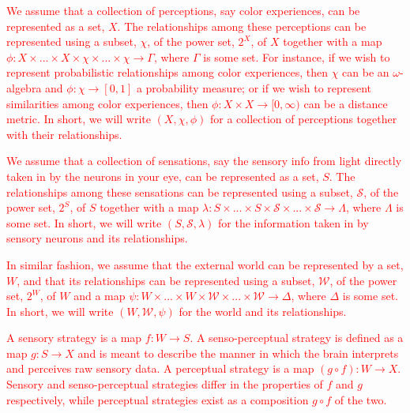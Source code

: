 \documentclass{article}[10pt]
\begin{document}
\textcolor{red}{We assume that a collection of perceptions, say color experiences, can be represented as a set, $X$. 
The relationships among these perceptions can be represented using a subset, $\chi$, of the power set, $2^X$, of $X$ together with a map $\phi: X \times ... \times X \times \chi \times ... \times \chi \rightarrow \Gamma$, where $\Gamma$ is some set. 
For instance, if we wish to represent probabilistic relationships among color experiences, then $\chi$ can be an $\omega$-algebra and $\phi:\chi \rightarrow [0,1]$ a probability measure; or if we wish to represent similarities among color experiences, then $\phi:X \times X \rightarrow [0,\infty)$ can be a distance metric. 
In short, we will write $(X,\chi,\phi)$ for a collection of perceptions together with their relationships.} \par
\textcolor{red}{We assume that a collection of sensations, say the sensory info from light directly taken in by the neurons in your eye, can be represented as a set, $S$.  
The relationships among these sensations can be represented using a subset, $\mathcal{S}$, of the power set, $2^S$, of $S$ together with a map $\lambda:S \times ... \times S \times \mathcal{S} \times ... \times \mathcal{S} \rightarrow \Lambda$, where $\Lambda$ is some set. 
In short, we will write $(S, \mathcal{S}, \lambda)$ for the information taken in by sensory neurons and its relationships.}  \par 
\textcolor{red}{In similar fashion, we assume that the external world can be represented by a set, $W$, and that its relationships can be represented using a subset, $\mathcal{W}$, of the power set, $2^W$, of $W$ and a map $\psi:W \times ... \times W \times \mathcal{W} \times ... \times \mathcal{W} \rightarrow \Delta$, where $\Delta$ is some set. 
In short, we will write $(W,\mathcal{W},\psi)$ for the world and its relationships.} \par
\textcolor{red}{A sensory strategy is a map $f: W \rightarrow S$.
A senso-perceptual strategy is defined as a map $g: S \rightarrow X$ and is meant to describe the manner in which the brain interprets and perceives raw sensory data.
A perceptual strategy is a map $(g \circ f):W \rightarrow X$. 
Sensory and senso-perceptual strategies differ in the properties of $f$ and $g$ respectively, while perceptual strategies exist as a composition $g \circ f$ of the two.}\\
\end{document}
